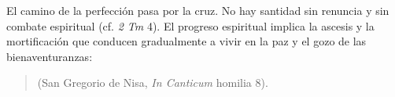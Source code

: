 	 El camino de la perfección pasa por la cruz. No hay santidad sin renuncia y sin combate espiritual (cf. \emph{2 Tm} 4). El progreso espiritual implica la ascesis y la mortificación que conducen gradualmente a vivir en la paz y el gozo de las bienaventuranzas:
	
	\begin{quote}
		 (San Gregorio de Nisa, \emph{In Canticum} homilia 8).
	\end{quote}
	
